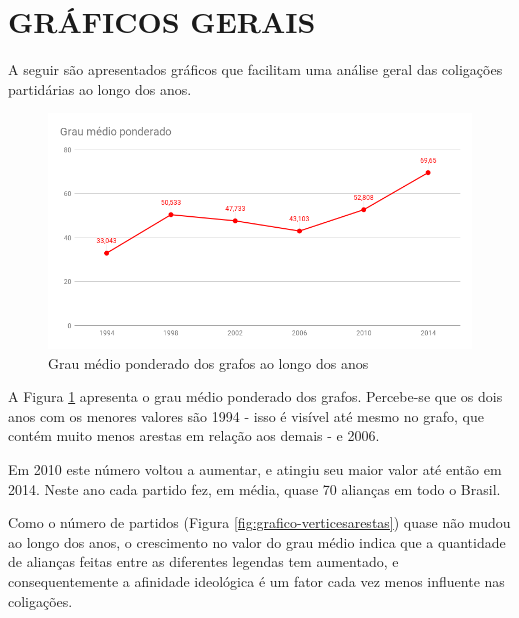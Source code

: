 \section{\texorpdfstring{\MakeUppercase{Gráficos Gerais}}{}}
\label{resultados__graficos-gerais}

A seguir são apresentados gráficos que facilitam uma análise geral das coligações partidárias ao longo dos anos. 

\begin{figure}[H]
\includegraphics[width=1\textwidth]{4-resultados/graficos/graumedioponderado.png}
\centering
\caption{
    Grau médio ponderado dos grafos ao longo dos anos
}
\label{fig:grafico-graumedioponderado}
\end{figure}

A Figura \ref{fig:grafico-graumedioponderado} apresenta o grau médio ponderado dos grafos. Percebe-se que os dois anos com os menores valores são 1994 - isso é visível até mesmo no grafo, que contém muito menos arestas em relação aos demais -  e 2006.

Em 2010 este número voltou a aumentar, e atingiu seu maior valor até então em 2014. Neste ano cada partido fez, em média, quase 70 alianças em todo o Brasil. 

Como o número de partidos (Figura \ref{fig:grafico-verticesarestas}) quase não mudou ao longo dos anos, o crescimento no valor do grau médio indica que a quantidade de alianças feitas entre as diferentes legendas tem aumentado, e consequentemente a afinidade ideológica é um fator cada vez menos influente nas coligações.

